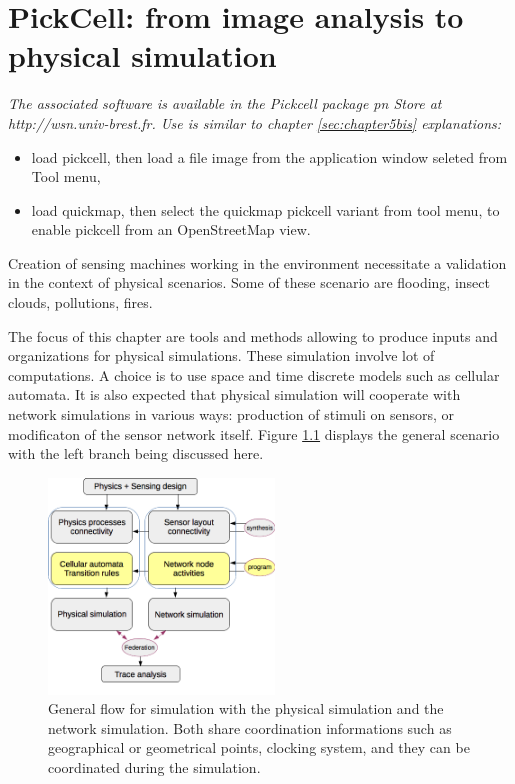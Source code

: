 
\chapter{PickCell: from image analysis to physical simulation} 
 
{\sl The associated software is available in the Pickcell package pn Store at http://wsn.univ-brest.fr.
Use is similar to  chapter  \ref{sec:chapter5bis} explanations: 
\begin{itemize}
\item load pickcell, then load a file image from the application window seleted from Tool menu,
\item load quickmap, then select the quickmap pickcell variant from tool menu, to enable
pickcell from an OpenStreetMap view.
\end{itemize}
}


Creation of sensing machines working in the environment necessitate 
a validation  in the context of physical scenarios. Some of these 
scenario are flooding, insect clouds, pollutions, fires.

The focus of this chapter are tools and methods allowing to produce inputs and  organizations
for physical  simulations. These simulation involve lot of computations. A  choice
is to use  space and time  discrete  models such as
cellular automata. It is also expected that physical simulation  will cooperate with network simulations
in various ways: production of stimuli on sensors, or  modificaton  of the sensor network 
itself. Figure \ref{fig:physics+sensorsFlow} displays the general scenario with
the left branch being discussed here.



\begin{figure}[hbtp]
\begin{center} 
\includegraphics[width=6cm]{physics+sensorsFlow.png}
\caption{General flow for simulation with the physical simulation and the network simulation.
Both share coordination  informations such as geographical or geometrical points, clocking system,
and they can be coordinated during the simulation.}
\label{fig:physics+sensorsFlow}
\end{center}
\end{figure}


